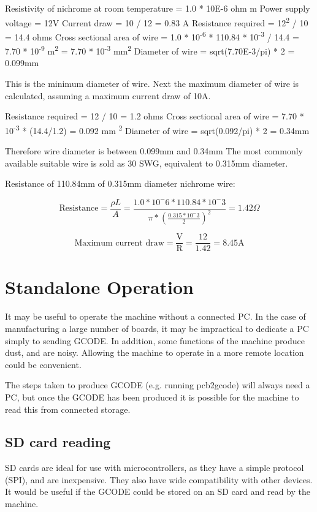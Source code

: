 Resistivity of nichrome at room temperature = 1.0 * 10E-6 ohm m 
Power supply voltage = 12V
Current draw = 10 / 12 = 0.83 A 
Resistance required = 12\textsuperscript{2} / 10 = 14.4 ohms
Cross sectional area of wire = 1.0 * 10\textsuperscript{-6} * 110.84 * 10\textsuperscript{-3} / 14.4 = 7.70 * 10\textsuperscript{-9} m\textsuperscript{2} = 7.70 * 10\textsuperscript{-3} mm\textsuperscript{2}
Diameter of wire = sqrt(7.70E-3/pi) * 2 = 0.099mm

This is the minimum diameter of wire. Next the maximum diameter of wire is calculated, assuming a maximum current draw of 10A.

Resistance required = 12 / 10 = 1.2 ohms
Cross sectional area of wire = 7.70 * 10\textsuperscript{-3} * (14.4/1.2) = 0.092 mm \textsuperscript{2}
Diameter of wire = sqrt(0.092/pi) * 2 = 0.34mm

Therefore wire diameter is between 0.099mm and 0.34mm
The most commonly available suitable wire is sold as 30 SWG, equivalent to 0.315mm diameter.

Resistance of 110.84mm of 0.315mm diameter nichrome wire:

\begin{displaymath}
\text{Resistance} = \frac{\rho L}{A}
= \frac{1.0*10^-6*110.84*10^-3}{\pi*(\frac{0.315*10^-3}{2})^2}
= 1.42 \Omega
\end{displaymath}



\begin{displaymath}
\text{Maximum current draw} = \frac{\text{V}}{\text{R}}
= \frac{12}{1.42}
= 8.45 \text{A}
\end{displaymath}

\section{Standalone Operation}
It may be useful to operate the machine without a connected PC. In the case of manufacturing a large number of boards, it may be impractical to dedicate a PC simply to sending GCODE.
In addition, some functions of the machine produce dust, and are noisy. Allowing the machine to operate in a more remote location could be convenient. 

The steps taken to produce GCODE (e.g. running pcb2gcode) will always need a PC, but once the GCODE has been produced it is possible for the machine to read this from connected storage.

\subsection{SD card reading}
SD cards are ideal for use with microcontrollers, as they have a simple protocol (SPI), and are inexpensive. They also have wide compatibility with other devices. It would be useful if 
the GCODE could be stored on an SD card and read by the machine.

